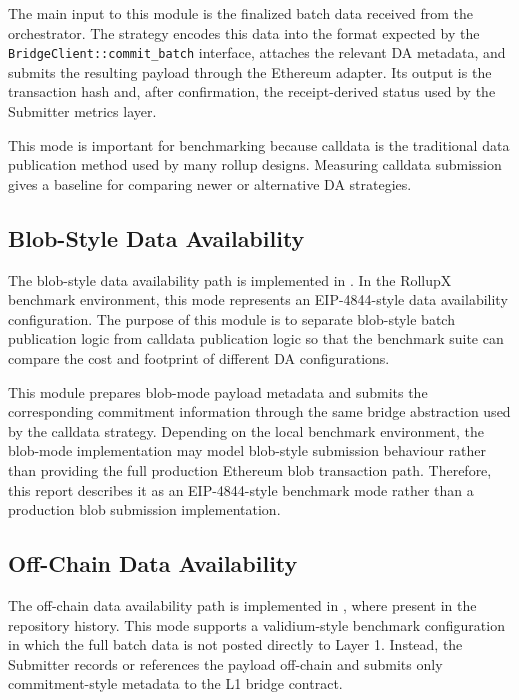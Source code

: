The main input to this module is the finalized batch data received from the orchestrator. The strategy encodes this data into the format expected by the \texttt{BridgeClient::commit\_batch} interface, attaches the relevant DA metadata, and submits the resulting payload through the Ethereum adapter. Its output is the transaction hash and, after confirmation, the receipt-derived status used by the Submitter metrics layer.

This mode is important for benchmarking because calldata is the traditional data publication method used by many rollup designs. Measuring calldata submission gives a baseline for comparing newer or alternative DA strategies.

\subsection{Blob-Style Data Availability}

The blob-style data availability path is implemented in . In the RollupX benchmark environment, this mode represents an EIP-4844-style data availability configuration. The purpose of this module is to separate blob-style batch publication logic from calldata publication logic so that the benchmark suite can compare the cost and footprint of different DA configurations.

This module prepares blob-mode payload metadata and submits the corresponding commitment information through the same bridge abstraction used by the calldata strategy. Depending on the local benchmark environment, the blob-mode implementation may model blob-style submission behaviour rather than providing the full production Ethereum blob transaction path. Therefore, this report describes it as an EIP-4844-style benchmark mode rather than a production blob submission implementation.

\subsection{Off-Chain Data Availability}

The off-chain data availability path is implemented in , where present in the repository history. This mode supports a validium-style benchmark configuration in which the full batch data is not posted directly to Layer 1. Instead, the Submitter records or references the payload off-chain and submits only commitment-style metadata to the L1 bridge contract.

